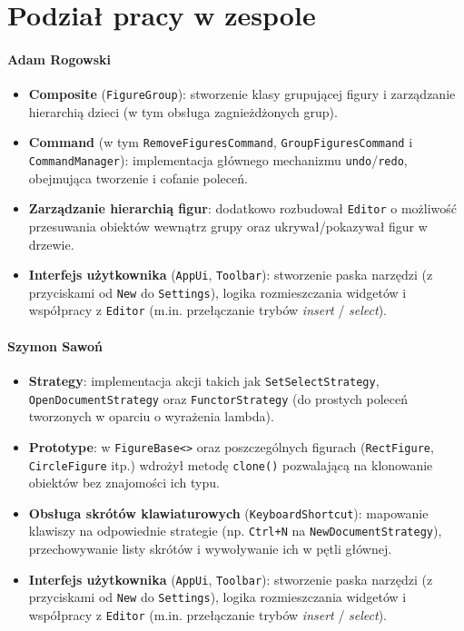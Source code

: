 \documentclass[a4paper,12pt]{article}
\begin{document}
\section{Podział pracy w zespole}

\paragraph{Adam Rogowski}
\begin{itemize}
    \item \textbf{Composite} (\texttt{FigureGroup}): stworzenie klasy grupującej figury i zarządzanie hierarchią dzieci (w tym obsługa zagnieżdżonych grup).
    \item \textbf{Command} (w tym \texttt{RemoveFiguresCommand}, \texttt{GroupFiguresCommand} i \texttt{CommandManager}): implementacja głównego mechanizmu \texttt{undo}/\texttt{redo}, obejmująca tworzenie i cofanie poleceń.
    \item \textbf{Zarządzanie hierarchią figur}: dodatkowo rozbudował \texttt{Editor} o możliwość przesuwania obiektów wewnątrz grupy oraz ukrywał/pokazywał figur w drzewie.
    \item \textbf{Interfejs użytkownika} (\texttt{AppUi}, \texttt{Toolbar}): stworzenie paska narzędzi (z przyciskami od \texttt{New} do \texttt{Settings}), logika rozmieszczania widgetów i współpracy z \texttt{Editor} (m.in. przełączanie trybów \emph{insert} / \emph{select}).
\end{itemize}

\paragraph{Szymon Sawoń}
\begin{itemize}
    \item \textbf{Strategy}: implementacja akcji takich jak \texttt{SetSelectStrategy}, \texttt{OpenDocumentStrategy} oraz \texttt{FunctorStrategy} (do prostych poleceń tworzonych w oparciu o wyrażenia lambda).
    \item \textbf{Prototype}: w \texttt{FigureBase<>} oraz poszczególnych figurach (\texttt{RectFigure}, \texttt{CircleFigure} itp.) wdrożył metodę \texttt{clone()} pozwalającą na klonowanie obiektów bez znajomości ich typu.
    \item \textbf{Obsługa skrótów klawiaturowych} (\texttt{KeyboardShortcut}): mapowanie klawiszy na odpowiednie strategie (np. \texttt{Ctrl+N} na \texttt{NewDocumentStrategy}), przechowywanie listy skrótów i wywoływanie ich w pętli głównej.
    \item \textbf{Interfejs użytkownika} (\texttt{AppUi}, \texttt{Toolbar}): stworzenie paska narzędzi (z przyciskami od \texttt{New} do \texttt{Settings}), logika rozmieszczania widgetów i współpracy z \texttt{Editor} (m.in. przełączanie trybów \emph{insert} / \emph{select}).
\end{itemize}
\end{document}
